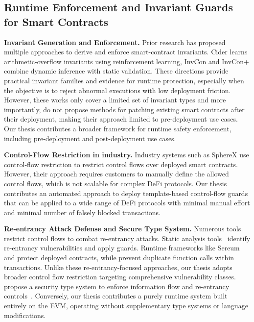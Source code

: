 \subsection{Runtime Enforcement and Invariant Guards for Smart Contracts}

\noindent \textbf{Invariant Generation and Enforcement.}
Prior research has proposed multiple approaches to 
derive and enforce smart-contract invariants.
Cider\cite{liu2022learning} learns arithmetic-overflow invariants 
using reinforcement learning,
InvCon and InvCon+\cite{liu2022invcon,liu2024automated} combine 
dynamic inference with static validation. 
These directions provide practical invariant families 
and evidence for runtime protection,
especially when the objective is to reject abnormal executions 
with low deployment friction. However, 
these works only cover a limited set of invariant types and 
more importantly, do not propose methods for 
patching existing smart contracts after their deployment, 
making their approach limited to pre-deployment use cases. 
Our thesis contributes a broader framework for runtime safety enforcement,
including pre-deployment and post-deployment use cases.


\noindent \textbf{Control-Flow Restriction in industry.}
Industry systems such as SphereX use control-flow 
restriction to restrict control flows over deployed smart contracts\cite{spherex}.
However, their approach requires 
customers to manually define the allowed control flows, 
which is not scalable for complex DeFi protocols. Our thesis 
contributes an automated approach 
to deploy template-based control-flow guards that can be applied 
to a wide range of DeFi protocols with minimal manual effort and minimal 
number of falsely blocked transactions.



\noindent
\textbf{Re-entrancy Attack Defense and Secure Type System.}
Numerous tools restrict control flows to combat re-entrancy attacks. 
Static analysis tools~\cite{luu2016making,torres2018osiris,
liu2018reguard,feist2019slither,
zhang2019mpro,bose2022sailfish,ma2021pluto,zheng2022park,wang2024efficiently,
albert2020taming} identify re-entrancy vulnerabilities and apply guards. 
Runtime frameworks like Sereum~\cite{rodler2018sereum} and 
\citeauthor{grossman2017online} protect deployed contracts, 
while \citeauthor{callens2024temporarily} prevent duplicate 
function calls within transactions. Unlike these 
re-entrancy-focused approaches, our thesis adopts broader 
control flow restriction targeting comprehensive vulnerability classes.
\citeauthor{cecchetti2020securing} propose a security type system to 
enforce information flow and re-entrancy controls~\cite{cecchetti2020securing,
cecchetti2021compositional}. Conversely, 
our thesis contributes a purely runtime system built entirely on the EVM, 
operating without supplementary type systems or language modifications.




